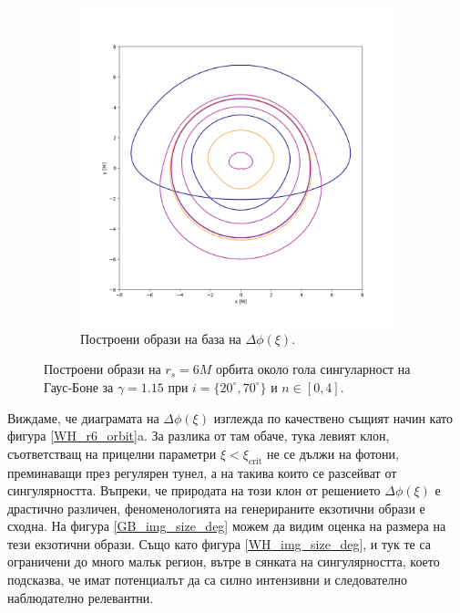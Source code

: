 \begin{figure}[!htb]
\begin{subfigure}{6cm}
		\includegraphics[scale = 0.3]{GB_70_deg_r6_gamma_1.15.png}
		\caption{Построени образи на база на  $\Delta\phi(\xi)$.} 
	\end{subfigure}
	\caption[Построени образи на $r_s = 6M$ орбита около гола сингулярност на Гаус-Боне за различни инклинации.]{\small Построени образи на $r_s = 6M$ орбита около гола сингуларност на Гаус-Боне за $\gamma = 1.15$ при $i = \{20^\circ, 70^\circ\}$ и $n\in[0,4]$.} 
	\label{GB_r6_20_deg_gamma_1.15}
\end{figure}
Виждаме, че диаграмата на $\Delta\phi(\xi)$ изглежда по качествено същият начин като фигура \ref{WH_r6_orbit}a. За разлика от там обаче, тука левият клон, съответстващ на прицелни параметри $\xi < \xi_\text{crit}$ не се дължи на фотони, преминаващи през регулярен тунел, а на такива които се разсейват от сингулярността. Въпреки, че природата на този клон от решението $\Delta\phi(\xi)$ е драстично различен, феноменологията на генерираните екзотични образи е сходна. На фигура \ref{GB_img_size_deg} можем да видим оценка на размера на тези екзотични образи. Също като фигура \ref{WH_img_size_deg}, и тук те са ограничени до много малък регион, вътре в сянката на сингулярността, което подсказва, че имат потенциалът да са силно интензивни и следователно наблюдателно релевантни.

